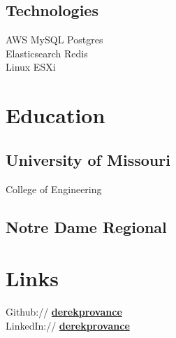 \documentclass[]{resume}
\begin{document}
\begin{minipage}[t]{0.33\textwidth}
\subsection{Technologies}
AWS \textbullet{} MySQL \textbullet{}  Postgres \\
Elasticsearch \textbullet{}  Redis \\
Linux \textbullet{} ESXi
\sectionsep


\section{Education}

\subsection{University of Missouri}
College of Engineering \\
\sectionsep

\subsection{Notre Dame Regional}
\sectionsep


\section{Links}
Github:// \href{https://github.com/derekprovance}{\bf derekprovance} \\
LinkedIn://  \href{https://www.linkedin.com/in/derekprovance}{\bf derekprovance} \\

%
%

\end{minipage}
\hfill
\end{document}
